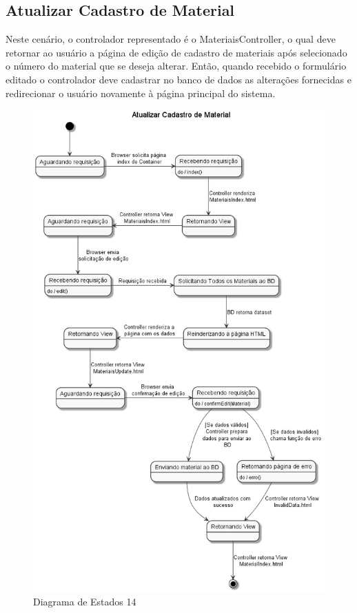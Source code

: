 \documentclass[rascunho,xindy,acronym,symbols]{fei}
\begin{document}
\subsection{Atualizar Cadastro de Material}

Neste cenário, o controlador representado é o MateriaisController, o qual deve retornar ao usuário a página de edição de cadastro de materiais após selecionado o número do material que se deseja alterar. Então, quando recebido o formulário editado o controlador deve cadastrar no banco de dados as alterações fornecidas e redirecionar o usuário novamente à página principal do sistema.

\begin{figure}[H]
    \centering
    \includegraphics[scale=0.6, width=350pt]{./Images/DE_-_Atualizar_Cadastro_de_Material.png}
    \caption{Diagrama de Estados 14}
    \label{fig:diag_est14}
\end{figure}
\end{document}
